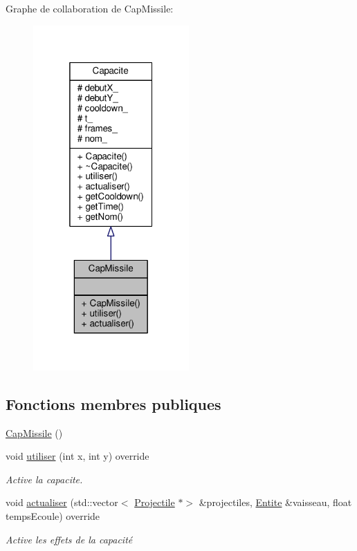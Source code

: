 Graphe de collaboration de Cap\+Missile\+:\nopagebreak
\begin{figure}[H]
\begin{center}
\leavevmode
\includegraphics[width=169pt]{class_cap_missile__coll__graph}
\end{center}
\end{figure}
\subsection*{Fonctions membres publiques}
\begin{DoxyCompactItemize}
\item 
\hyperlink{class_cap_missile_a82f039eadaaba1712780a56598daae2a}{Cap\+Missile} ()
\item 
void \hyperlink{class_cap_missile_a4ba082615a3721083142549a4c8216ad}{utiliser} (int x, int y) override
\begin{DoxyCompactList}\small\item\em Active la capacite. \end{DoxyCompactList}\item 
void \hyperlink{class_cap_missile_adcb6a35330589c49910e6dd6cc7f2f7d}{actualiser} (std\+::vector$<$ \hyperlink{class_projectile}{Projectile} $\ast$$>$ \&projectiles, \hyperlink{class_entite}{Entite} \&vaisseau, float temps\+Ecoule) override
\begin{DoxyCompactList}\small\item\em Active les effets de la capacité \end{DoxyCompactList}\end{DoxyCompactItemize}
